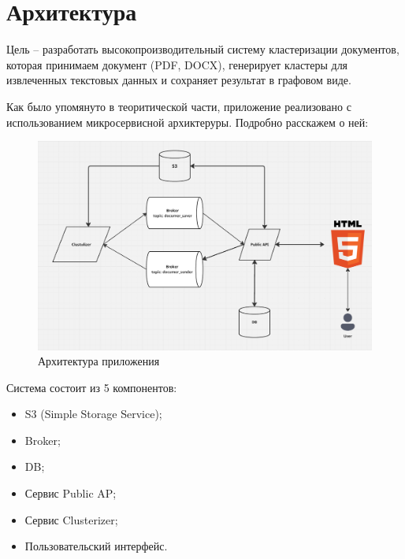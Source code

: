 

\practic


\section{Архитектура}
Цель – разработать высокопроизводительный систему кластеризации документов, которая принимаем документ (PDF, DOCX), генерирует кластеры для извлеченных текстовых данных и сохраняет результат в графовом виде. 

Как было упомянуто в теоритической части, приложение реализовано с использованием микросервисной архиктеруры. Подробно расскажем о ней:

\begin{figure}[h!]
    \centering
    \includegraphics[width=1\textwidth]{styles/diploma/inc/microservice2.png} 
    \caption{Архитектура приложения}
    \label{fig:example}
\end{figure}
Система состоит из 5 компонентов:
\begin{itemize}
    \item S3 (Simple Storage Service);
    \item Broker;
    \item DB;
    \item  Сервис  Public AP;
    \item Сервис  Clusterizer;
    \item Пользовательский интерфейс.
    
  \end{itemize}
